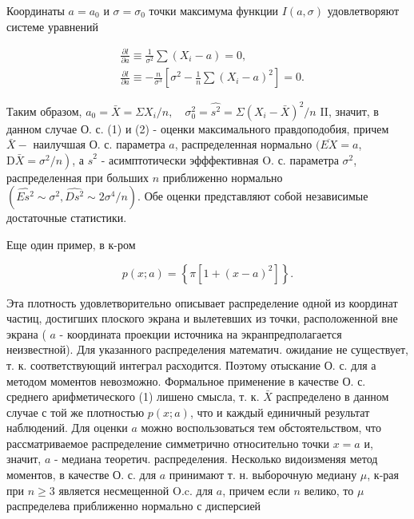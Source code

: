 \documentclass[10pt]{article}
\begin{document}
Координаты $a=a_{0}$ и $\sigma=\sigma_{0}$ точки максимума функции $I(a, \sigma)$ удовлетворяют системе уравнений



\[

\begin{aligned}

& \frac{\partial l}{\partial a} \equiv \frac{1}{\sigma^{2}} \sum\left(X_{i}-a\right)=0, \\

& \frac{\partial l}{\partial a} \equiv-\frac{n}{\sigma^{3}}\left[\sigma^{2}-\frac{1}{n} \sum\left(X_{i}-a\right)^{2}\right]=0 .

\end{aligned}

\]



Таким образом, $a_{0}=\bar{X}=\Sigma X_{i} / n, \quad \sigma_{0}^{2}=\hat{s^{2}}=\Sigma\left(X_{i}-\bar{X}\right)^{2} / n$ II, значит, в данном случае О. с. (1) и (2) - оценки максимального правдоподобия, причем $\bar{X}-$ наилучшая О. с. параметра $a$, распределенная нормально $(\overline{E X}=a$, $\left.\mathrm{D} \bar{X}=\sigma^{2} / n\right)$, а $\hat{s}^{2}$ - асимптотически эфффективная O. с. параметра $\sigma^{2}$, распределенная при больших $n$ приближенно нормально $\left(\hat{E s^{2}} \sim \sigma^{2}, \widehat{D s^{2}} \sim 2 \sigma^{4} / n\right)$. Обе оценки представляют собой независимые достаточные статистики.



Еще один пример, в к-ром



\[

p(x ; a)=\left\{\pi\left[1+(x-a)^{2}\right]\right\} .

\]



Эта плотность удовлетворительно описывает распределение одной из координат частиц, достигших плоского экрана и вылетевших из точки, расположенной вне экрана ( $a$ - координата проекции источника на экранпредполагается неизвестной). Для указанного распределения математич. ожидание не существует, т. к. соответствующий интеграл расходится. Поэтому отыскание О. с. для а методом моментов невозможно. Формальное применение в качестве О. с. среднего арифметического (1) лишено смысла, т. к. $\bar{X}$ распределено в данном случае с той же плотностью $p(x ; a)$, что и каждый единичный результат наблюдений. Для оценки $a$ можно воспользоваться тем обстоятельством, что рассматриваемое распределение симметрично относительно точки $x=a$ и, значит, $a$ - медиана теоретич. распределения. Несколько видоизменяя метод моментов, в качестве О. с. для $a$ принимают т. н. выборочную медиану $\mu$, к-рая при $n \geqslant 3$ является несмещенной $\mathrm{O} . \mathrm{c}$. для $a$, причем если $n$ велико, то $\mu$ распределева приближенно нормально с дисперсией
\end{document}
